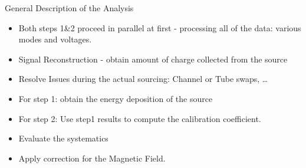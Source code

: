 \documentclass[pdf, 9pt]{beamer}
\begin{document}
  \begin{frame}{General Description of the Analysis}
    \begin{itemize}
      \item Both steps 1\&2 proceed in parallel at first -  processing all of the data: various modes and voltages.
      \item Signal Reconstruction - obtain amount of charge collected from the source
      \item Resolve Issues during the actual sourcing: Channel or Tube swaps, \dots
      \item For step 1: obtain the energy deposition of the source
      \item For step 2: Use step1 results to compute the calibration coefficient.
      \item Evaluate the systematics
      \item Apply correction for the Magnetic Field.
    \end{itemize}
  \end{frame}
\end{document}
